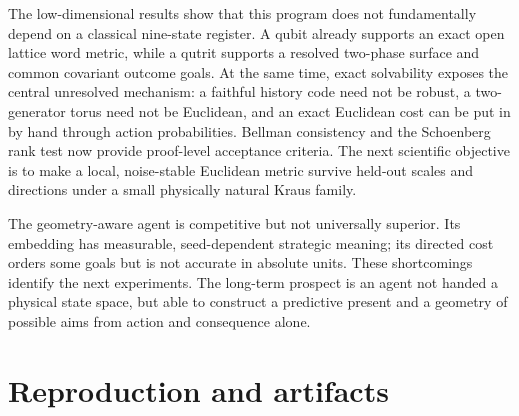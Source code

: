 \documentclass[11pt]{article}
\begin{document}
The low-dimensional results show that this program does not fundamentally
depend on a classical nine-state register. A qubit already supports an exact
open lattice word metric, while a qutrit supports a resolved two-phase surface
and common covariant outcome goals. At the same time, exact solvability exposes
the central unresolved mechanism: a faithful history code need not be robust,
a two-generator torus need not be Euclidean, and an exact Euclidean cost can be
put in by hand through action probabilities. Bellman consistency and the
Schoenberg rank test now provide proof-level acceptance criteria. The next
scientific objective is to make a local, noise-stable Euclidean metric survive
held-out scales and directions under a small physically natural Kraus family.

The geometry-aware agent is competitive but not universally superior. Its
embedding has measurable, seed-dependent strategic meaning; its directed cost
orders some goals but is not accurate in absolute units. These shortcomings
identify the next experiments. The long-term prospect is an agent not handed a
physical state space, but able to construct a predictive present and a geometry
of possible aims from action and consequence alone.

\appendix
\section{Reproduction and artifacts}
\end{document}
